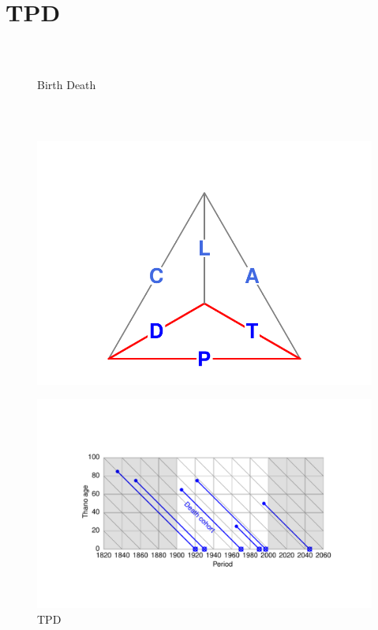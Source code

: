 \documentclass[20pt]{beamer}
\begin{document}
\section{TPD}
\begin{frame} 
\frametitle{~}
\begin{figure}
    \centering
    \caption{Birth \hspace{4in} Death}
    \vspace{-5em}
\end{figure} 
\end{frame} 

\begin{frame}
\frametitle{~}
\vspace{-6em}
\begin{figure}
\raggedleft
    \includegraphics[scale=.7]{Figures/TetraTPDprg.pdf}
\end{figure}
\vspace{-3em}
\begin{figure}[b]
    \centering
    \caption{TPD}
    \includegraphics{Figures/LabPres/TPD2.pdf}
\end{figure} 
\end{frame}
\end{document}
